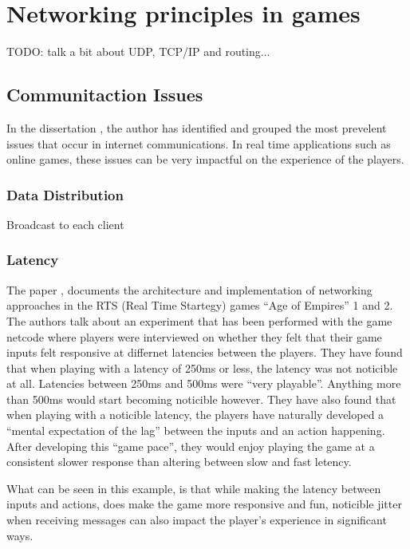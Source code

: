 \newpage
\section{Networking principles in games}
TODO: talk a bit about UDP, TCP/IP and routing...

\subsection{Communitaction Issues}
In the dissertation , the author has identified and grouped the most prevelent issues that occur in internet communications. In real time applications such as online games, these issues can be very impactful on the experience of the players.

\subsubsection{Data Distribution}
Broadcast to each client

\subsubsection{Latency}
The paper , documents the architecture and implementation of networking approaches in the RTS (Real Time Startegy) games ``Age of Empires'' 1 and 2. The authors talk about an experiment that has been performed with the game netcode where players were interviewed on whether they felt that their game inputs felt responsive at differnet latencies between the players. They have found that when playing with a latency of 250ms or less, the latency was not noticible at all. Latencies between 250ms and 500ms were ``very playable''. Anything more than 500ms would start becoming noticible however. They have also found that when playing with a noticible latency, the players have naturally developed a ``mental expectation of the lag'' between the inputs and an action happening. After developing this ``game pace'', they would enjoy playing the game at a consistent slower response than altering between slow and fast letency.

What can be seen in this example, is that while making the latency between inputs and actions, does make the game more responsive and fun, noticible jitter when receiving messages can also impact the player's experience in significant ways.


